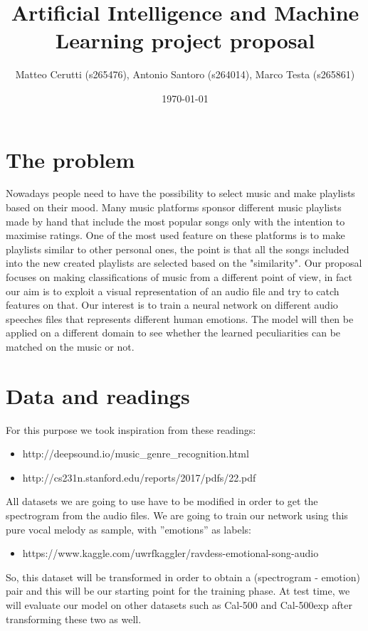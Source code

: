 \documentclass{paper}
\title{Artificial Intelligence and Machine Learning project proposal}
\author{Matteo Cerutti (s265476), Antonio Santoro (s264014), Marco Testa (s265861)}
\date{\today}
\begin{document}
\maketitle

\section{The problem}

Nowadays people need to have the possibility to select music and make playlists based on their mood. Many music platforms sponsor different music playlists made by hand that include the most popular songs only with the intention to maximise ratings. One of the most used feature on these platforms is to make playlists similar to other personal ones, the point is that all the songs included into the new created playlists are selected based on the "similarity". Our proposal focuses on making classifications of music from a different point of view, in fact our aim is to exploit a visual representation of an audio file and try to catch features on that. Our interest is to train a neural network on different audio speeches files that represents different human emotions. The model will then be applied on a different domain to see whether the learned peculiarities can be matched on the music or not.

\section{Data and readings}

For this purpose we took inspiration from these readings:
\begin{itemize}
    \item http://deepsound.io/music\_genre\_recognition.html
    \item http://cs231n.stanford.edu/reports/2017/pdfs/22.pdf
\end{itemize}
All datasets we are going to use have to be modified in order to get the spectrogram from the audio files.
We are going to train our network using this pure vocal melody as sample, with ''emotions'' as labels:
\begin{itemize}
    \item https://www.kaggle.com/uwrfkaggler/ravdess-emotional-song-audio 
\end{itemize} 
So, this dataset will be transformed in order to obtain a (spectrogram - emotion) pair and this will be our starting point for the training phase.
At test time, we will evaluate our model on other datasets such as Cal-500 and Cal-500exp after transforming these two as well.
\end{document}

